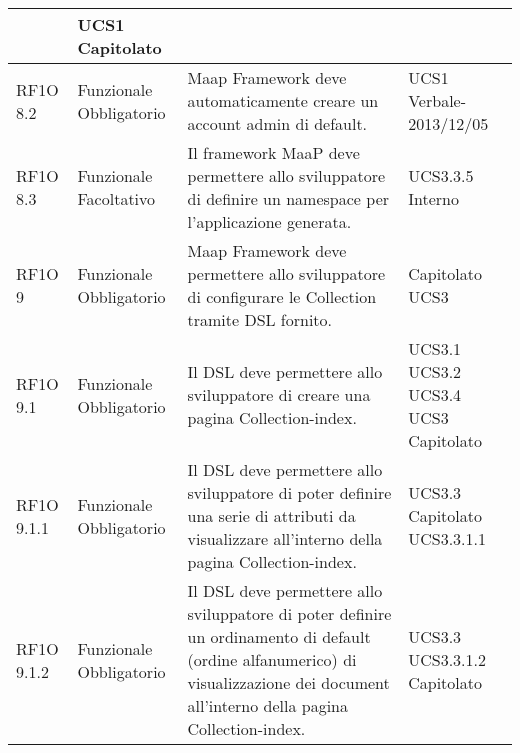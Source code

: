 \begin{center}
\begin{longtable}{ | l | p{2cm} | p{5cm} | p{1.7cm} |}
 &  UCS1 \newline  Capitolato \newline  \\ \hline      
        RF1O 8.2  & Funzionale \newline  Obbligatorio  & Maap Framework deve automaticamente creare un account admin di default. &  UCS1 \newline  Verbale-2013/12/05 \newline  \\ \hline      
        RF1O 8.3 & Funzionale \newline  Facoltativo  & Il framework MaaP deve permettere allo sviluppatore di definire un namespace per l'applicazione generata. &  UCS3.3.5 \newline  Interno \newline  \\ \hline      
        RF1O 9  & Funzionale \newline  Obbligatorio  & Maap Framework deve permettere allo sviluppatore di configurare le Collection tramite DSL fornito.
 &  Capitolato \newline  UCS3 \newline  \\ \hline      
        RF1O 9.1  & Funzionale \newline  Obbligatorio  & Il DSL deve permettere allo sviluppatore di creare una pagina Collection-index.
 &  UCS3.1 \newline  UCS3.2 \newline  UCS3.4 \newline  UCS3 \newline  Capitolato \newline  \\ \hline      
        RF1O 9.1.1  & Funzionale \newline  Obbligatorio  & Il DSL deve permettere allo sviluppatore di poter definire una serie di attributi da visualizzare all'interno della pagina Collection-index.
 &  UCS3.3 \newline  Capitolato \newline  UCS3.3.1.1 \newline  \\ \hline      
        RF1O 9.1.2  & Funzionale \newline  Obbligatorio  & Il DSL deve permettere allo sviluppatore di poter definire un ordinamento di default (ordine alfanumerico) di visualizzazione dei document all'interno della pagina Collection-index. &  UCS3.3 \newline  UCS3.3.1.2 \newline  Capitolato \newline  \\ \hline      

\end{longtable}
\end{center}
